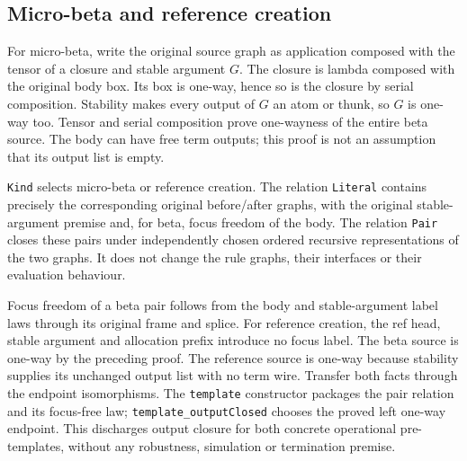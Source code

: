 \subsection{Micro-beta and reference creation}
For micro-beta, write the original source graph as application composed
with the tensor of a closure and stable argument $G$. The closure is lambda
composed with the original body box. Its box is one-way, hence so is the
closure by serial composition. Stability makes every output of $G$ an atom
or thunk, so $G$ is one-way too. Tensor and serial composition prove
one-wayness of the entire beta source. The body can have free term outputs;
this proof is not an assumption that its output list is empty.


\texttt{Kind} selects micro-beta or reference creation. The relation
\texttt{Literal} contains precisely the corresponding original before/after
graphs, with the original stable-argument premise and, for beta, focus freedom
of the body. The relation \texttt{Pair} closes these pairs under independently
chosen ordered recursive representations of the two graphs. It does not
change the rule graphs, their interfaces or their evaluation behaviour.


Focus freedom of a beta pair follows from the body and stable-argument label
laws through its original frame and splice. For reference creation, the ref
head, stable argument and allocation prefix introduce no focus label.
The beta source is one-way by the preceding proof. The reference source is
one-way because stability supplies its unchanged output list with no term
wire. Transfer both facts through the endpoint isomorphisms. The
\texttt{template} constructor packages the pair relation and its focus-free
law; \texttt{template\_outputClosed} chooses the proved left one-way endpoint.
This discharges output closure for both concrete operational pre-templates,
without any robustness, simulation or termination premise.


